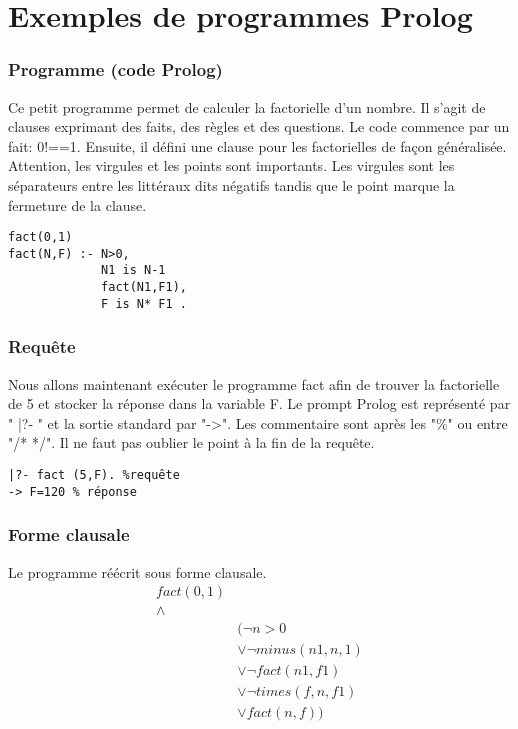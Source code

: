 
\author{Baptiste Degryse (27641200)}
\author{Charles Jacquet (27811200)}

\section{Exemples de programmes Prolog}

\subsubsection{Programme (code Prolog)}
Ce petit programme permet de calculer la factorielle d'un nombre. Il s'agit de clauses exprimant des faits, des règles et des questions. Le code commence par un fait: 0!==1. Ensuite, il défini une clause pour les factorielles de façon généralisée. Attention, les virgules et les points sont importants. Les virgules sont les séparateurs entre les littéraux dits négatifs tandis que le point marque la fermeture de la clause.
\begin{verbatim}
fact(0,1)
fact(N,F) :- N>0, 
			 N1 is N-1 
			 fact(N1,F1), 
			 F is N* F1 .
\end{verbatim}
\subsubsection{Requête} Nous allons maintenant exécuter le programme fact afin de trouver la factorielle de 5 et stocker la réponse dans la variable F. Le prompt Prolog est représenté par " |?- " et la sortie standard par "->". Les commentaire sont après les "\%" ou entre "/* */". Il ne faut pas oublier le point à la fin de la requête.
\begin{verbatim} 
|?- fact (5,F). %requête
-> F=120 % réponse
\end{verbatim}

\subsubsection{Forme clausale}
Le programme réécrit sous forme clausale. 
\begin{align*}
fact(0,1) \\
 \wedge & \\
&( \neg n > 0 \\
&	\vee \neg minus( n1, n, 1) \\
&	\vee \neg fact(n1, f1) \\
&	\vee \neg times(f, n, f1) \\
&	\vee fact(n, f) ) \\
\end{align*}



